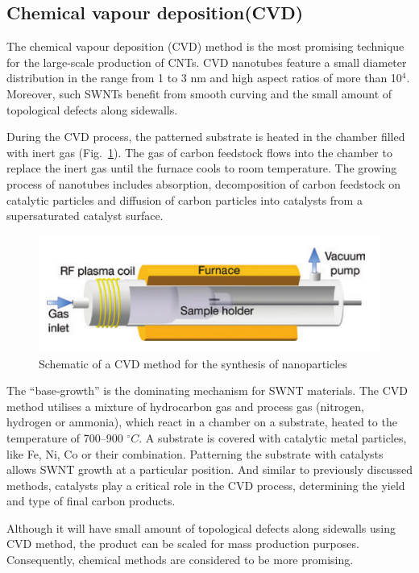 \documentclass{phyasgn}\usepackage{nag}
\newcommand{\figref}[1]{Fig.~\ref{#1}}
\begin{document}
\subsection{Chemical vapour deposition(CVD)}
The chemical vapour deposition (CVD) method is the most promising technique for the large-scale production of CNTs. CVD nanotubes feature a small diameter distribution in the range from 1 to 3 nm and high aspect ratios of more than 10$^4$. Moreover, such SWNTs benefit from smooth curving and the small amount of topological defects along sidewalls.
\par During the CVD process, the patterned substrate is heated in the chamber filled with inert gas (\figref{6}). The gas of carbon feedstock flows into the chamber to replace the inert gas until the furnace cools to room temperature. The growing process of nanotubes includes absorption, decomposition of carbon feedstock on catalytic particles and diffusion of carbon particles into catalysts from a supersaturated catalyst surface. 
\begin{figure}[!h]
	\centering
	\includegraphics[width=.85\linewidth]{pic/6.png}
	\caption[Band structures]{Schematic of a CVD method for the synthesis of nanoparticles\cite{li2004preferential}}
	\label{6}
	\end{figure}
\par The “base-growth” is the dominating mechanism for SWNT materials. The CVD method utilises a mixture of hydrocarbon gas and process gas (nitrogen, hydrogen or ammonia), which react in a chamber on a substrate, heated to the temperature of 700–900 $^{\circ}C$. A substrate is covered with catalytic metal particles, like Fe, Ni, Co or their combination. Patterning the substrate with catalysts allows SWNT growth at a particular position. And similar to previously discussed methods, catalysts play a critical role in the CVD process, determining the yield and type of final carbon  products\cite{cassell1999large}.
\par Although it will have small amount of topological defects along sidewalls using CVD method, the product can be scaled for mass production purposes. Consequently, chemical methods are considered to be more promising.
\end{document}
